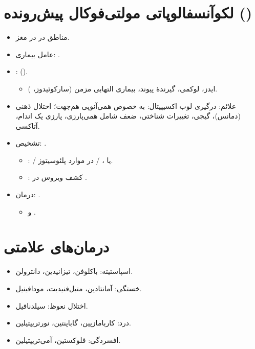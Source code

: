 \documentclass[a4paper,12pt]{extbook}
\begin{document}
\section*{لکوآنسفالوپاتی مولتی‌فوکال پیش‌رونده ()}
\begin{itemize}
\item مناطق  در  در مغز.
\item عامل بیماری: .
\item {}:  ().
\begin{itemize}
\item ایدز، لوکمی، گیرندهٔ پیوند، بیماری التهابی مزمن (سارکوئیدوز، ).
\end{itemize}
\item علائم: درگیری لوب اکسیپیتال:  به خصوص همی‌آنوپی هم‌جهت؛ اختلال ذهنی (دمانس)، گیجی، تغییرات شناختی، ضعف شامل همی‌پارزی، پارزی یک اندام، آتاکسی.
\item تشخیص: .
\begin{itemize}
\item {}:  / یا ،  / در  موارد پلئوسیتوز.
\item {}: کشف  ویروس در .
\end{itemize}
\item درمان: .
\begin{itemize}
\item {} و .
\end{itemize}
\end{itemize}
\section*{درمان‌های علامتی }
\begin{itemize}
\item اسپاستیته: باکلوفن، تیزانیدین، دانترولن.
\item خستگی: آمانتادین، متیل‌فنیدیت، مودافینیل.
\item اختلال نعوظ: سیلدنافیل.
\item درد: کاربامازپین، گاباپنتین، نورتریپتیلین.
\item افسردگی: فلوکستین، آمی‌تریپتیلین.
\end{itemize}
\endgroup
\ifMSStandalone
  \expandafter\enddocument
\fi
\end{document}
